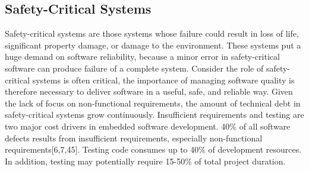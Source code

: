 \subsection{Safety-Critical Systems}
Safety-critical systems are those systems whose failure could result in loss of life, significant property damage, or damage to the environment\cite{knight2002safety}. These systems put a huge demand on software reliability, because a minor error in safety-critical software can produce failure of a complete system\cite{ebert2009embedded,trienekens2010quality,pretschner2007software}. Consider the role of safety-critical systems is often critical, the importance of managing software quality is therefore necessary to deliver software in a useful, safe, and reliable way. Given the lack of focus on non-functional requirements, the amount of technical debt in safety-critical systems grow continuously. Insufficient requirements and testing are two major cost drivers in embedded software development\cite{ebert2009embedded,graaf2003embedded}. 40\% of all software defects results from insufficient requirements, especially non-functional requirements[6,7,45]\cite{ebert2009embedded,graaf2003embedded,washizaki2007quality}. Testing code consumes up to 40\% of development resources. In addition, testing may potentially require 15-50\% of total project duration\cite{ebert2009embedded}.  

